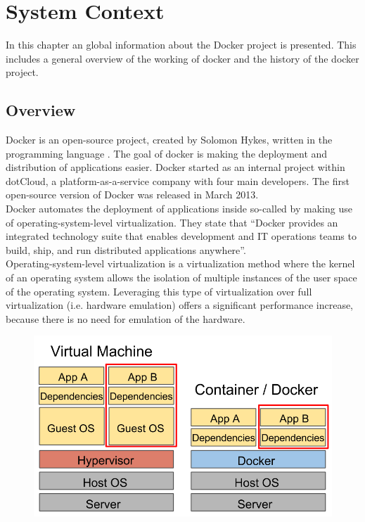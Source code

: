 \chapter{System Context}
\label{ch:context}

In this chapter an global information about the Docker project is presented. This includes a general overview of the working of docker and the history of the docker project.

\section{Overview}

Docker is an open-source project, created by Solomon Hykes, written in the  programming language \cite{golang}. The goal of docker is making the deployment and distribution of applications easier. Docker started as an internal project within dotCloud, a platform-as-a-service company with four main developers. The first open-source version of Docker was released in March 2013.\\

Docker automates the deployment of applications inside so-called  by making use of operating-system-level virtualization.
They state that ``Docker provides an integrated technology suite that enables development and IT operations teams to build, ship, and run distributed applications anywhere''\cite{whatisdocker}.\\

Operating-system-level virtualization is a virtualization method where the kernel of an operating system allows the isolation of multiple instances of the user space of the operating system. Leveraging this type of virtualization over full virtualization (i.e. hardware emulation) offers a significant performance increase, because there is no need for emulation of the hardware.\cite{VirtualizationTechnologies}

\begin{figure}[b!]
\centering
\includegraphics[scale=0.40,keepaspectratio=true]{./2-context/vmvsdocker}

\label{fig:vmvsdocker}
\end{figure}

